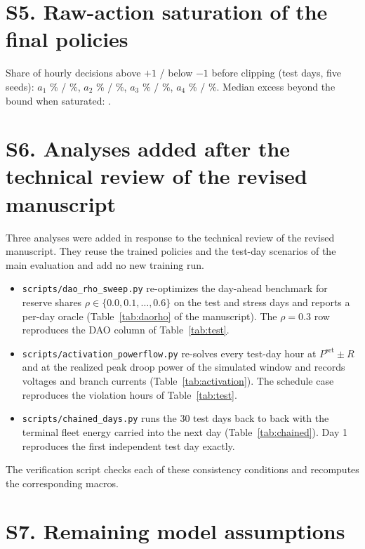 \documentclass[10pt,a4paper]{article}
\begin{document}
\section*{S5. Raw-action saturation of the final policies}

Share of hourly decisions above $+1$ / below $-1$ before clipping (test days, five seeds):
$a_1$ \ClipAbovePsetOne\% / \ClipBelowPsetOne\%, $a_2$ \ClipAbovePsetTwo\% / \ClipBelowPsetTwo\%,
$a_3$ \ClipAboveRhoOne\% / \ClipBelowRhoOne\%, $a_4$ \ClipAboveRhoTwo\% / \ClipBelowRhoTwo\%.
Median excess beyond the bound when saturated: \ClipMedianExcess.

\section*{S6. Analyses added after the technical review of the revised manuscript}

Three analyses were added in response to the technical review of the revised manuscript. They reuse the
trained policies and the test-day scenarios of the main evaluation and add no new training run.
\begin{itemize}
\item \texttt{scripts/dao\_rho\_sweep.py} re-optimizes the day-ahead benchmark for reserve shares
$\rho\in\{0.0,0.1,\dots,0.6\}$ on the test and stress days and reports a per-day oracle
(Table~\ref{tab:daorho} of the manuscript). The $\rho=0.3$ row reproduces the DAO column of Table~\ref{tab:test}.
\item \texttt{scripts/activation\_powerflow.py} re-solves every test-day hour at $P^{\mathrm{set}}\pm R$ and at the
realized peak droop power of the simulated window and records voltages and branch currents
(Table~\ref{tab:activation}). The schedule case reproduces the violation hours of Table~\ref{tab:test}.
\item \texttt{scripts/chained\_days.py} runs the 30 test days back to back with the terminal fleet energy carried
into the next day (Table~\ref{tab:chained}). Day 1 reproduces the first independent test day exactly.
\end{itemize}
The verification script checks each of these consistency conditions and recomputes the corresponding macros.

\section*{S7. Remaining model assumptions}
\end{document}
